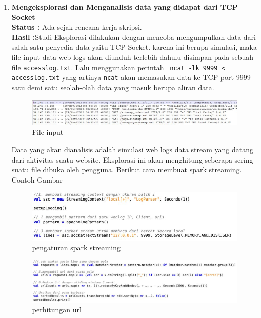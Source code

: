 \documentclass[a4paper,twoside]{article}
\begin{document}
\begin{enumerate}
		\item \textbf{Mengeksplorasi dan Menganalisis data yang didapat dari TCP Socket}\\
		{\bf Status :} Ada sejak rencana kerja skripsi.\\
		{\bf Hasil :}Studi Eksplorasi dilakukan dengan mencoba mengumpulkan data dari salah satu 				penyedia data yaitu TCP Socket. karena ini berupa simulasi, maka file input data web logs 				akan diunduh terlebih dahulu disimpan pada sebuah file \texttt{accesslog.txt}. Lalu 					menggunakan perintah \texttt{ ncat -lk 9999 < accesslog.txt} yang artinya \texttt{ncat} akan 		memasukan data ke TCP port 9999 satu demi satu seolah-olah data yang masuk berupa aliran 				data.

		\begin{figure}[H] 
		\centering  
		\includegraphics[scale=0.8]{ncatinput}  
		\caption[Gambar File input]{File input} 
		\label{fig:Output-Log-Parser} 
		\end{figure}

		Data yang akan dianalisis adalah simulasi web logs data stream yang datang dari aktivitas 				suatu website. Eksplorasi ini akan menghitung seberapa sering suatu file dibuka oleh 					pengguna. Berikut cara membuat spark streaming. Contoh Gambar
  
		\begin{figure}[H] 
		\centering  
		\includegraphics[scale=0.7]{urlcountersetup}  
		\caption[Gambar pengaturan spark streaming]{pengaturan spark streaming} 
		\label{fig:Output-Log-Parser} 
		\end{figure}

		\begin{figure}[H] 
		\centering  
		\includegraphics[scale=0.7]{urlcountertransform}  
		\caption[Gambar perhitungan url]{perhitungan url} 
		\label{fig:Output-Log-Parser} 
		\end{figure}


\end{enumerate}
\end{document}
